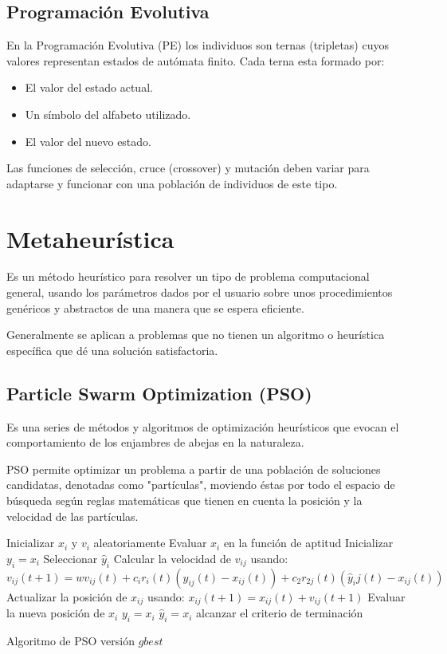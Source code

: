 \documentclass[
]{article}
\begin{document}
\subsection{Programación Evolutiva}
En la Programación Evolutiva (PE) los individuos son ternas (tripletas) cuyos valores representan estados de autómata finito. Cada terna esta formado por:
\begin{itemize}
	\item El valor del estado actual.
	\item Un símbolo del alfabeto utilizado.
	\item El valor del nuevo estado.
\end{itemize}

Las funciones de selección, cruce (crossover) y mutación deben variar para adaptarse y funcionar con una población de individuos de este tipo.

\section{Metaheurística}
Es un método heurístico para resolver un tipo de problema computacional general, usando los parámetros dados por el usuario sobre unos procedimientos genéricos y abstractos de una manera que se espera eficiente.

Generalmente se aplican a problemas que no tienen un algoritmo o heurística específica que dé una solución satisfactoria.
\subsection{Particle Swarm Optimization (PSO)}
Es una series de métodos y algoritmos de optimización heurísticos que evocan el comportamiento de los enjambres de abejas en la naturaleza.

PSO permite optimizar un problema a partir de una población de soluciones candidatas, denotadas como "partículas", moviendo éstas por todo el espacio de búsqueda según reglas matemáticas que tienen en cuenta la posición y la velocidad de las partículas.
\begin{algorithm}
\begin{algorithmic}[1]
\STATE Inicializar $x_i$ y $v_i$ aleatoriamente
\STATE Evaluar $x_i$ en la función de aptitud
\STATE Inicializar $y_i = x_i$
\ENDFOR
\STATE Seleccionar $\hat{y}_i$
\REPEAT
{}
\STATE Calcular la velocidad de $v_{ij}$ usando: \newline$v_{ij}(t+1) = wv_{ij}(t) + c_ir_i(t)(y_{ij}(t)-x_{ij}(t)) + c_2r_{2j}(t)(\hat{y}_ij(t) - x_{ij}(t))$
\STATE Actualizar la posición de $x_{ij}$ usando:
\newline $x_{ij}(t+1) = x_{ij}(t) + v_{ij}(t+1)$
\ENDFOR
\STATE Evaluar la nueva posición de $x_i$
\STATE $y_i = x_i$
\ENDIF
{}
\STATE $\hat{y}_i = x_i$
\ENDIF
\ENDFOR
\UNTIL alcanzar el criterio de terminación
\end{algorithmic}
\caption{Algoritmo de PSO versión $gbest$}\label{alg:algoritmoPSO}
\end{algorithm}
\end{document}
